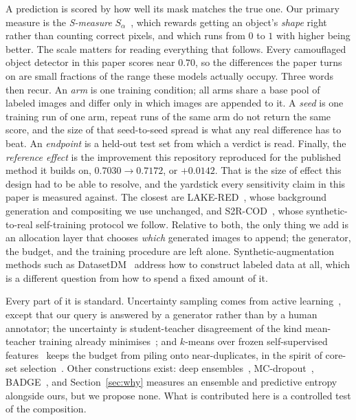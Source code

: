 \documentclass{article}
\begin{document}
A prediction is scored by how well its mask matches the true one. Our primary measure is the \emph{S-measure} $S_\alpha$~\citep{fan2017structure}, which rewards getting an object's \emph{shape} right rather than counting correct pixels, and which runs
from $0$ to $1$ with higher being better. The scale matters for reading everything that follows. Every
camouflaged object detector in this paper scores near $0.70$, so the differences the paper turns on are small fractions
of the range these models actually occupy. Three words then recur. An \textit{arm} is one training
condition; all arms share a base pool of labeled images and differ only in which images are
appended to it. A \textit{seed} is one training run of one arm, repeat runs of the same arm do
not return the same score, and the size of that seed-to-seed spread is what any real difference has
to beat. An \textit{endpoint} is a held-out test set from which a verdict is read. Finally, the
\textit{reference effect} is the improvement this repository reproduced for the published method it
builds on, $0.7030 \rightarrow 0.7172$, or $+0.0142$. That is the size of effect this design had to
be able to resolve, and the yardstick every sensitivity claim in this paper is measured against. The closest are LAKE-RED~\citep{zhao2024lakered}, whose background generation and compositing we use unchanged, and
S2R-COD~\citep{luo2025s2rcod}, whose synthetic-to-real self-training protocol we follow. Relative to
both, the only thing we add is an allocation layer that chooses \emph{which} generated images to
append; the generator, the budget, and the training procedure are left alone. Synthetic-augmentation methods such as DatasetDM~\citep{wu2023datasetdm} address how to construct labeled data at all, which is a different question from how to spend a fixed amount of it.

Every part of it is standard. Uncertainty sampling comes from active learning~\citep{settles2009active}, except that our query is answered by a generator rather than by a human annotator; the uncertainty is student-teacher disagreement of the
kind mean-teacher training already minimises~\citep{tarvainen2017mean}; and $k$-means over frozen
self-supervised features~\citep{oquab2024dinov2,radford2021learning} keeps the budget from piling
onto near-duplicates, in the spirit of core-set selection~\citep{sener2018active}. Other
constructions exist: deep ensembles~\citep{lakshminarayanan2017simple},
MC-dropout~\citep{gal2016dropout}, BADGE~\citep{ash2020deep}, and Section~\ref{sec:why} measures
an ensemble and predictive entropy alongside ours, but we propose none. What is contributed here is a controlled test of the composition. 
\end{document}
